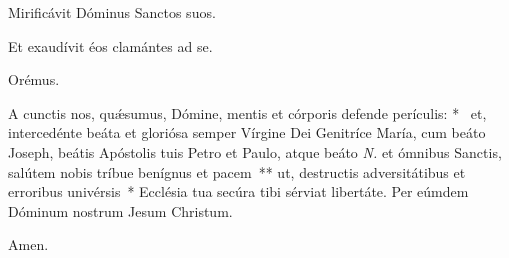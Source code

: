 \noindent \vv Mirificávit Dóminus San\-ctos suos.

\noindent \rr Et exaudívit éos clamántes ad se.

Orémus.

\lettrine{A}{} cun\-ctis nos, quǽsumus, Dómine, mentis et córporis defende perículis: \nolinebreak[4]*~ et, intercedénte beáta et gloriósa semper Vírgine Dei Genitríce María, cum beáto Joseph, beátis Apóstolis tuis Petro et Paulo, atque beáto \textit{N.} et ómnibus Sanctis, salútem nobis tríbue benígnus et pacem~** ut, destructis adversitátibus et erroribus univérsis~* Ecclésia tua secúra tibi sérviat libertáte. Per eúmdem Dóminum nostrum Jesum Christum.

\rr Amen.


%
%
%
%
